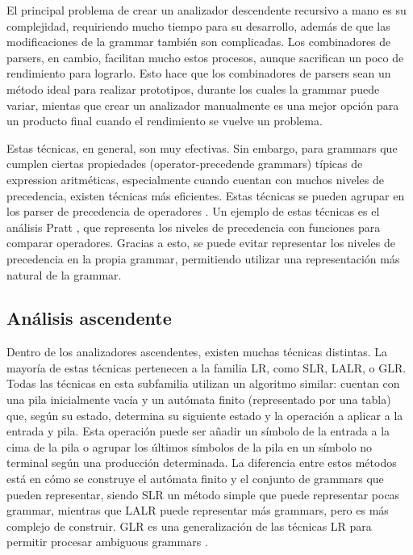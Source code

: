 El principal problema de crear un analizador descendente recursivo a mano es su
complejidad, requiriendo mucho tiempo para su desarrollo, además de que las
modificaciones de la \gls{grammar} también son complicadas. Los combinadores de
\glspl{parser}, en cambio, facilitan mucho estos procesos, aunque sacrifican un
poco de rendimiento para lograrlo. Esto hace que los combinadores de
\glspl{parser} sean un método ideal para realizar prototipos, durante los cuales
la \gls{grammar} puede variar, mientas que crear un analizador manualmente es
una mejor opción para un producto final cuando el rendimiento se vuelve un
problema.

Estas técnicas, en general, son muy efectivas. Sin embargo, para \glspl{grammar}
que cumplen ciertas propiedades (\glspl{operator-precedende grammar}) típicas de
\gls{expression} aritméticas, especialmente cuando cuentan con muchos niveles de
precedencia, existen técnicas más eficientes. Estas técnicas se pueden agrupar
en los \gls{parser} de precedencia de operadores
\parencite{operator-precedence-parser}. Un ejemplo de estas técnicas es el
análisis Pratt \parencite{pratt-parsing-paper}
\parencite{pratt-parsing-example}, que representa los niveles de precedencia con
funciones para comparar operadores. Gracias a esto, se puede evitar representar los niveles de
precedencia en la propia \gls{grammar}, permitiendo utilizar una representación
más natural de la \gls{grammar}.

\subsection{Análisis ascendente}

Dentro de los analizadores ascendentes, existen muchas técnicas distintas. La
mayoría de estas técnicas pertenecen a la familia LR, como SLR, LALR, o GLR.
Todas las técnicas en esta subfamilia utilizan un algoritmo similar: cuentan con
una pila inicialmente vacía y un autómata finito (representado por una tabla)
que, según su estado, determina su siguiente estado y la operación a aplicar a
la entrada y pila. Esta operación puede ser añadir un símbolo de la entrada a la
cima de la pila o agrupar los últimos símbolos de la pila en un símbolo no
terminal según una producción determinada. La diferencia entre estos métodos
está en cómo se construye el autómata finito y el conjunto de \glspl{grammar}
que pueden representar, siendo SLR un método simple que puede representar pocas
\gls{grammar}, mientras que LALR puede representar más \glspl{grammar}, pero es
más complejo de construir. \parencite{dragon-book} GLR es una generalización de
las técnicas LR para permitir procesar \glspl{ambiguous grammar}
\parencite{GLR-algorithm}.

